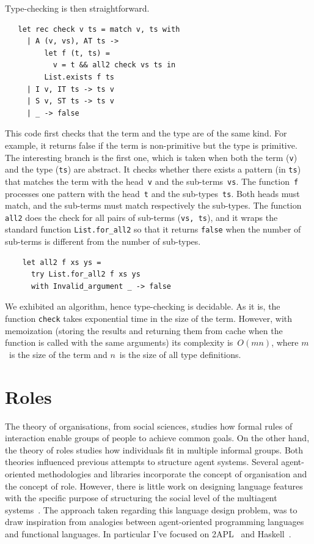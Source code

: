 \documentclass[a4paper,12pt,oneside,fleqn]{book} %
\newcommand{\rg}[1]{\marginpar{\tiny\raggedright\textcolor{blue}{\bf rg:} #1}}
\newcommand{\todo}[1]{[\textcolor{red}{TODO}: #1]}
\renewcommand{\rg}{}
\begin{document}
{Type-checking is then straightforward.
\begin{verbatim}
   let rec check v ts = match v, ts with
     | A (v, vs), AT ts ->
         let f (t, ts) =
           v = t && all2 check vs ts in
         List.exists f ts
     | I v, IT ts -> ts v
     | S v, ST ts -> ts v
     | _ -> false
\end{verbatim}
This code first checks that the term and the type are of the same kind. For
example, it returns false if the term is non-primitive but the type is
primitive. The interesting branch is the first one, which is taken when
both the term (\verb|v|) and the type (\verb|ts|) are abstract. It checks whether there exists a
pattern (in \verb|ts|) that matches the term with the head~\verb|v| and the
sub-terms~\verb|vs|. The function~\verb|f| processes one pattern with the
head~\verb|t| and the sub-types~\verb|ts|. Both heads must match, and the
sub-terms must match respectively the sub-types. The function \verb|all2|
does the check for all pairs of sub-terms (\verb|vs, ts|), and it
wraps the standard function \verb|List.for_all2| so that it returns
\verb|false| when the number of sub-terms is different from the number of
sub-types.
\begin{verbatim}
    let all2 f xs ys =
      try List.for_all2 f xs ys
      with Invalid_argument _ -> false
\end{verbatim}

We exhibited an algorithm, hence type-checking is decidable. As it is, the
function \verb|check| takes exponential time in the size of the term.
However, with memoization (storing the results and returning them from
cache when the function is called with the same arguments) its complexity
is~$O(mn)$, where $m$~is the size of the term and $n$~is the size of all
type definitions.

\section{Roles}\label{sec:roles} %
The theory of organisations, from social sciences, studies how formal rules
of interaction enable groups of people to achieve common goals. On the
other hand, the theory of roles studies how individuals fit in multiple
informal groups. Both theories influenced previous attempts to structure agent
systems. Several agent-oriented methodologies and libraries incorporate the
concept of organisation and the concept of role.  However, there is little
work on designing language features with the specific purpose of
structuring the social level of the multiagent
systems~\cite{collier2005,DBLP:journals/entcs/BaldoniBT06,DBLP:conf/oopsla/RicciS11}.
The approach taken regarding this language design problem, was to draw
inspiration from analogies between agent-oriented programming languages and
functional languages. In particular I've focused on
2APL~\cite{DBLP:journals/aamas/Dastani08} and Haskell~\cite{web:haskell}.

}
\end{document}
